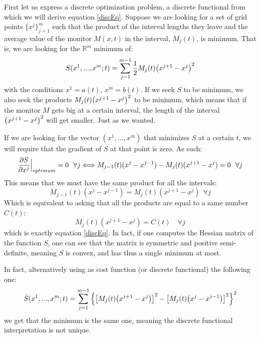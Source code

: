 \documentclass[11pt, a4paper]{article} %
\newcommand{\R}{\mathbb{R}} %
\begin{document}
First let us express a discrete optimization problem, a discrete functional from which we will derive equation \eqref{discEq}. Suppose we are looking for a set of grid points $\{x^j \}_{j=1}^m$ such that the product of the interval lengths they leave and the average value of the monitor $M(x,t)$ in the interval, $M_j(t)$, is minimum. That is, we are looking for the $\R^m$ minimum of: 
\begin{equation}\label{discFunc}
S( x^1,...,x^m;t)=\sum_{j=1}^{m-1} \frac{1}{2} M_j(t) \qty(x^{j+1}-x^j)^2
\end{equation}
with the conditions $x^1=a(t)$, $x^m=b(t)$. If we seek $S$ to be minimum, we also seek the products $M_j(t) \qty(x^{j+1}-x^j)^2$ to be minimum, which means that if the monitor $M$ gets big at a certain interval, the length of the interval $\qty(x^{j+1}-x^j)^2$ will get smaller. Just as we wanted.

If we are looking for the vector $(x^1,...,x^m)$ that minimizes $S$ at a certain $t$, we will require that the gradient of $S$ at that point is zero. As such:
\begin{equation}
\pdv{S}{x^j}\Big\rvert_{optimum}=0\ \ \forall j\Longleftrightarrow M_{j-1}(t)(x^j-x^{j-1})-M_j(t)(x^{j+1}-x^j)=0\ \ \forall j
\end{equation}
This means that we must have the same product for all the intervals:
\begin{equation}
 M_{j-1}(t)(x^j-x^{j-1})=M_j(t)(x^{j+1}-x^j)\ \ \forall j
\end{equation}
Which is equivalent to asking that all the products are equal to a same number $C(t)$:
\begin{equation}
M_j(t)(x^{j+1}-x^j)=C(t) \quad \forall j
\end{equation}
which is exactly equation \eqref{discEq}. In fact, if one computes the Hessian matrix of the function $S$, one can see that the matrix is symmetric and positive semi-definite, meaning $S$ is convex, and has thus a single minimum at most. 

In fact, alternatively using as cost function (or discrete functional) the following one:\vspace{-0.1cm}
\begin{equation}
\hat{S}(x^1,...,x^m;t)=\sum_{j=1}^{m-1} \qty{\qty[ M_j(t) \qty(x^{j+1}-x^j)]^2-\qty[ M_j(t) \qty(x^{j}-x^{j-1})]^2}^2\vspace{-0.1cm}
\end{equation}
we get that the minimum is the same one, meaning the discrete functional interpretation is not unique.
\end{document}
